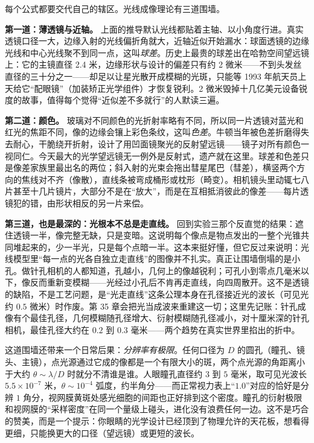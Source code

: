 \begin{mainline}


每个公式都要交代自己的辖区。光线成像理论有三道围墙。

\textbf{第一道：薄透镜与近轴。} 上面的推导默认光线都贴着主轴、以小角度行进。真实透镜口径一大，边缘入射的光线偏折角就大，近轴近似开始漏水：球面透镜的边缘光线和中心光线聚不到同一点，这叫\emph{球差}。历史上最贵的球差出在哈勃空间望远镜上：它的主镜直径 2.4 米，边缘形状与设计的偏差只有约 2 微米——不到头发丝直径的三十分之一——却足以让星光散开成模糊的光斑，只能等 1993 年航天员上天给它“配眼镜”（加装矫正光学组件）才恢复锐利。2 微米毁掉十几亿美元设备锐度的故事，值得每个觉得“近似差不多就行”的人默读三遍。

\textbf{第二道：颜色。} 玻璃对不同颜色的光折射率略有不同，所以同一片透镜对蓝光和红光的焦距不同，像的边缘会镶上彩色条纹，这叫\emph{色差}。牛顿当年被色差折磨得失去耐心，干脆绕开折射，设计了用凹面镜聚光的反射望远镜——镜子对所有颜色一视同仁。今天最大的光学望远镜无一例外是反射式，遗产就在这里。球差和色差只是像差家族里最出名的两位；斜入射的光束会拖出彗星尾巴（彗差），横竖两个方向的焦线对不齐（像散），直线条被弯成桶形或枕形（畸变）。相机镜头里动辄七八片甚至十几片镜片，大部分不是在“放大”，而是在互相抵消彼此的像差——每片透镜犯的错，由形状相反的另一片来偿。

\textbf{第三道，也是最深的：光根本不总是走直线。} 回到实验三那个反直觉的结果：遮住透镜一半，像完整无缺，只是变暗。这说明每个像点是物点发出的一整个光锥共同堆起来的，少一半光，只是每个点暗一半。这本来挺好懂，但它反过来说明：光线模型里“每一点的光各自独立走直线”的图像并不扎实。真正让围墙倒塌的是小孔。做针孔相机的人都知道，孔越小，几何上的像越锐利；可孔小到零点几毫米以下，像反而重新变模糊——光经过小孔后不肯再走直线，向四周散开。这不是透镜的缺陷，不是工艺问题，是“光走直线”这条公理本身在孔径接近光的波长（可见光约 $0.5$ 微米）时作废。第 35 章会把光当成波来重建这一切；这里先记账：针孔成像有个最佳孔径，几何模糊随孔径增大、衍射模糊随孔径减小，对十厘米深的针孔相机，最佳孔径大约在 $0.2$ 到 $0.3$ 毫米——两个趋势在真实世界里掐出的折中。

这道围墙还带来一个日常后果：\emph{分辨率有极限}。任何口径为 $D$ 的圆孔（瞳孔、镜头、主镜），点光源通过它成的像都是一个有限大小的斑，两个点光源的角距离小于大约 $\theta\sim\lambda/D$ 时就分不清谁是谁。人眼瞳孔直径约 $3$ 到 $5$ 毫米，取可见光波长 $5.5\times10^{-7}$ 米，$\theta\sim10^{-4}$ 弧度，约半角分——而正常视力表上“$1.0$”对应的恰好是分辨 $1$ 角分，视网膜黄斑处感光细胞的间距也正好排到这个密度。瞳孔的衍射极限和视网膜的“采样密度”在同一个量级上碰头，进化没有浪费任何一边。这不是巧合的赞美，而是一个提示：你眼睛的光学设计已经顶到了物理允许的天花板，想看得更细，只能换更大的口径（望远镜）或更短的波长。

\end{mainline}

